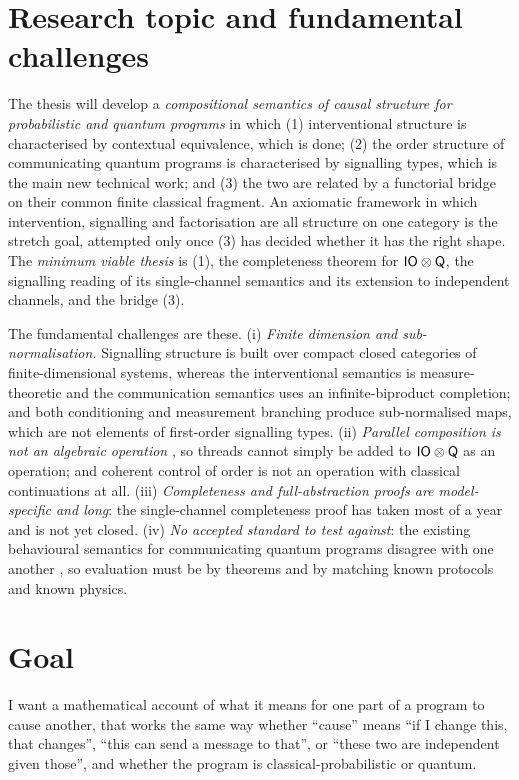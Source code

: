 \section{Research topic and fundamental challenges}

The thesis will develop a \emph{compositional semantics of causal structure for probabilistic and quantum programs} in which (1) interventional structure is characterised by contextual equivalence, which is done; (2) the order structure of communicating quantum programs is characterised by signalling types, which is the main new technical work; and (3) the two are related by a functorial bridge on their common finite classical fragment. An axiomatic framework in which intervention, signalling and factorisation are all structure on one category is the stretch goal, attempted only once (3) has decided whether it has the right shape. The \emph{minimum viable thesis} is (1), the completeness theorem for $\mathsf{IO}\otimes\mathsf{Q}$, the signalling reading of its single-channel semantics and its extension to independent channels, and the bridge (3).

The fundamental challenges are these. (i) \emph{Finite dimension and sub-normalisation.} Signalling structure is built over compact closed categories of finite-dimensional systems, whereas the interventional semantics is measure-theoretic and the communication semantics uses an infinite-biproduct completion; and both conditioning and measurement branching produce sub-normalised maps, which are not elements of first-order signalling types. (ii) \emph{Parallel composition is not an algebraic operation} \cite{stark:freamp,CSP_van_Glabbeek_2010}, so threads cannot simply be added to $\mathsf{IO}\otimes\mathsf{Q}$ as an operation; and coherent control of order is not an operation with classical continuations at all. (iii) \emph{Completeness and full-abstraction proofs are model-specific and long}: the single-channel completeness proof has taken most of a year and is not yet closed. (iv) \emph{No accepted standard to test against}: the existing behavioural semantics for communicating quantum programs disagree with one another \cite{lqCCS_10.1145/3632885}, so evaluation must be by theorems and by matching known protocols and known physics.

\section{Goal}

I want a mathematical account of what it means for one part of a program to cause another, that works the same way whether ``cause'' means ``if I change this, that changes'', ``this can send a message to that'', or ``these two are independent given those'', and whether the program is classical-probabilistic or quantum.

